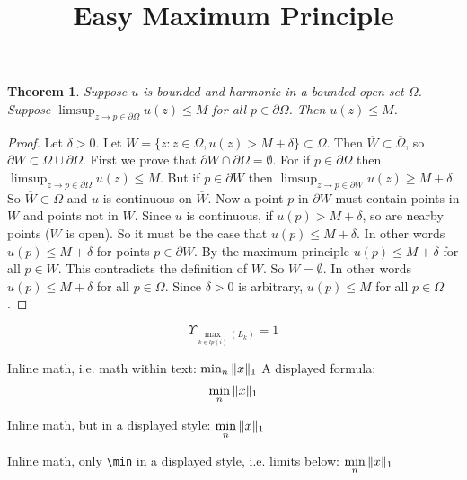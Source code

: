 \documentclass[11pt]{article}
\title{Easy Maximum Principle}
\author{}
\date{}
\def\ds{\displaystyle}
\newtheorem{theorem}{Theorem}
\def\ds{\displaystyle}
\def\ds{\displaystyle}
\begin{document}
\maketitle

\begin{theorem}
Suppose $u$ is bounded and harmonic in a bounded open set $\Omega$.
\newline  
Suppose $\ds \limsup_{z\to p \in \partial \Omega}u(z) \le M$ for all $p\in \partial \Omega$.  Then $u(z) \le M$.
\end{theorem}

\begin{proof}

Let $\delta >0$. Let $W=\{z: z\in \Omega, u(z)>M+\delta\} \subset \Omega$. Then $\overline{W} \subset \overline{\Omega}$, so $\partial W \subset \Omega \cup \partial \Omega$. First we prove that $\partial W \cap \partial \Omega = \emptyset$. For if $p\in \partial \Omega$ then $\limsup_{z\to p \in \partial \Omega}u(z) \le M$.  But if $p\in \partial W$ then 
$\limsup_{z\to p \in \partial W}u(z) \ge M+\delta$. So $\overline{W} \subset \Omega$ and $u$ is continuous on $\overline{W}$. Now a point $p$ in $\partial W$ must contain points in $W$ and points not in $W$. Since $u$ is continuous, if $u(p)>M+\delta$, so are nearby points ($W$ is open). So it must be the case that $u(p) \le M+\delta$.  In other words $u(p) \le M+\delta$ for points $p\in \partial W$. By the maximum principle $u(p) \le M+\delta$ for all $p\in W$.  This contradicts the definition of $W$.  So $W=\emptyset$. In other words $u(p)\le M+\delta$ for all $p\in \Omega$.  Since $\delta >0$ is arbitrary, $u(p) \le M$ for all $p \in \Omega$.
\end{proof}

\begin{equation}
\Upsilon_{\max_{k \in lp(i)}(L_k)} = 1
\end{equation}

Inline math, i.e. math within text: $\min_{n}\Arrowvert x \Arrowvert_{1}$
A displayed formula:
\[\min_{n}\Arrowvert x \Arrowvert_{1}\]
 
Inline math, but in a displayed style:
$\displaystyle\min_{n}\Arrowvert x \Arrowvert_{1}$
 
Inline math, only \verb|\min| in a displayed style, i.e. limits below:
$\min\limits_{n}\Arrowvert x \Arrowvert_{1}$

%
%
\end{document}
